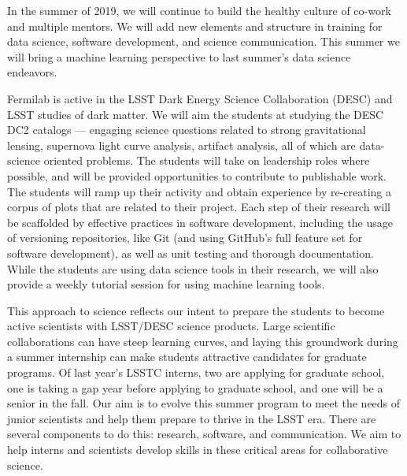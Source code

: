In the summer of 2019, we will continue to build the healthy culture of co-work and multiple mentors. 
We will add new elements and structure in training for data science, software development, and science communication.
This summer we will bring a machine learning perspective to last summer's
data science endeavors. 

\newpage

Fermilab is active in the LSST Dark Energy Science Collaboration (DESC) and LSST studies of dark matter.
We will aim the students at studying the DESC DC2 catalogs --- engaging science questions related to strong gravitational lensing, supernova light curve analysis, artifact analysis, all of which are data-science oriented problems. 
The students will take on leadership roles where possible, and will be provided opportunities to contribute to publishable work.
The students will ramp up their activity and obtain experience by re-creating a corpus of plots that are related to their project.
Each step of their research will be scaffolded by effective practices in software development, including the usage of versioning repositories, like Git (and using GitHub's full feature set for software development), as well as unit testing and thorough documentation.
While the students are using data science tools in their research, we will also provide a weekly tutorial session for using machine learning tools.




This approach to science reflects our intent to prepare the students to become active scientists
with LSST/DESC science products. 
Large scientific collaborations can have steep learning curves, and laying this groundwork during a summer internship can make students attractive candidates for graduate programs.
Of last year's LSSTC interns, two are applying for graduate school,
one is taking a gap year before applying to graduate school, and one
will be a senior in the fall.
Our aim is to evolve this summer program to meet the needs of junior scientists and help them prepare to thrive in the LSST era. 
There are several components to do this: research, software, and communication. We aim to help interns and scientists develop skills in these critical areas for collaborative science.

